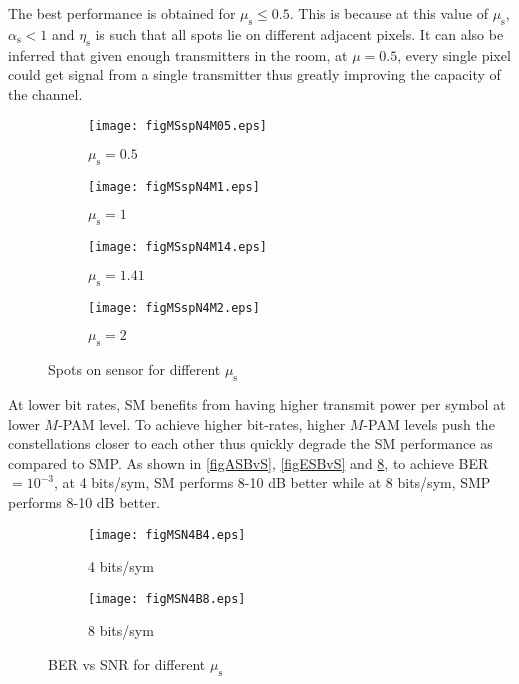 The best performance is obtained for $\mu_{\text{s}}\leq 0.5$. This is because at this value of $\mu_{\text{s}}$, $\alpha_{\text{s}}<1$ and $\eta_{\text{s}}$ is such that all spots lie on different adjacent pixels. It can also be inferred that given enough transmitters in the room, at $\mu=0.5$, every single pixel could get signal from a single transmitter thus greatly improving the capacity of the channel. 

\begin{figure}[!t]
	\centering
		\begin{subfigure}{0.49\textwidth}
			\centering
			\texttt{[image: figMSspN4M05.eps]}
			\caption{$\mu_{\text{s}}=0.5$}
			\label{figMSspN4M05}
		\end{subfigure}
		\hfill
		\begin{subfigure}{0.49\textwidth}
			\centering
			\texttt{[image: figMSspN4M1.eps]}
			\caption{$\mu_{\text{s}}=1$}
			\label{figMSspN4M1}
		\end{subfigure}
		\vfill
		\begin{subfigure}{0.49\textwidth}
			\centering
			\texttt{[image: figMSspN4M14.eps]}
			\caption{$\mu_{\text{s}}=1.41$}
			\label{figMSspN4M14}
		\end{subfigure}
		\hfill
		\begin{subfigure}{0.49\textwidth}
			\centering
		\texttt{[image: figMSspN4M2.eps]}
			\caption{$\mu_{\text{s}}=2$}
			\label{figMSspN4M2}
		\end{subfigure}
		\caption{Spots on sensor for different $\mu_{\text{s}}$}
		\label{figMSSpots}
\end{figure}

At lower bit rates, SM benefits from having higher transmit power per symbol at lower $M$-PAM level. To achieve higher bit-rates, higher $M$-PAM levels push the constellations closer to each other thus quickly degrade the SM performance as compared to SMP. As shown in \figurename{ \ref{figASBvS}}, \figurename{ \ref{figESBvS}} and \figurename{ \ref{figMSBvS}}, to achieve BER $=10^{-3}$, at 4 bits/sym, SM performs 8-10 dB better while at 8 bits/sym, SMP performs 8-10 dB better.

	\begin{figure}[!t]
		\centering
			\begin{subfigure}{\textwidth}
				\centering
				\texttt{[image: figMSN4B4.eps]}
				\caption{4 bits/sym}
				\label{figMSN4B4}
			\end{subfigure}
			
			\begin{subfigure}{\textwidth}
				\centering
				\texttt{[image: figMSN4B8.eps]}
				\caption{8 bits/sym}
				\label{figMSN4B8}
			\end{subfigure}
			
			\caption{BER vs SNR for different $\mu_{\text{s}}$}
			\label{figMSBvS}
	\end{figure}
	\clearpage%

